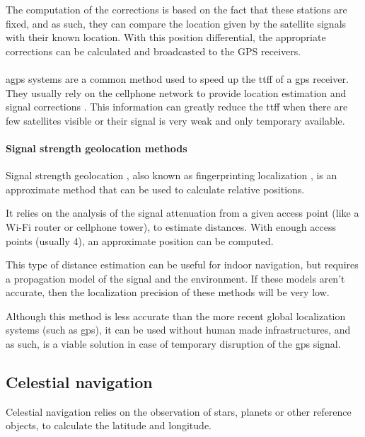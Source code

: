 The computation of the corrections \cite{Kim2007} is based on the fact that these stations are fixed, and as such, they can compare the location given by the satellite signals with their known location. With this position differential, the appropriate corrections can be calculated and broadcasted to the GPS receivers.

\paragraph{}

\gls{agps} systems are a common method used to speed up the \gls{ttff} of a \gls{gps} receiver. They usually rely on the cellphone network to provide location estimation and signal corrections \cite{R.1948}. This information can greatly reduce the \gls{ttff} when there are few satellites visible or their signal is very weak and only temporary available.

\paragraph{Signal strength geolocation methods}

Signal strength geolocation \cite{Kobayashi2002}, also known as fingerprinting localization \cite{Bshara2010}, is an approximate method that can be used to calculate relative positions.

It relies on the analysis of the signal attenuation from a given access point (like a Wi-Fi router or cellphone tower), to estimate distances. With enough access points (usually 4), an approximate position can be computed.

This type of distance estimation can be useful for indoor navigation, but requires a propagation model of the signal and the environment. If these models aren't accurate, then the localization precision of these methods will be very low.

Although this method is less accurate than the more recent global localization systems (such as \gls{gps}), it can be used without human made infrastructures, and as such, is a viable solution in case of temporary disruption of the \gls{gps} signal.


\subsection{Celestial navigation}

Celestial navigation \cite{Yang2011} relies on the observation of stars, planets or other reference objects, to calculate the latitude and longitude.

